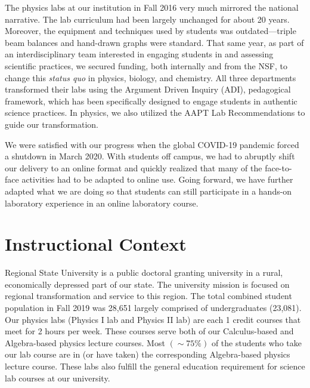 \documentclass[aip, numerical, preprint]{revtex4-2}
\begin{document}

The physics labs at our institution in Fall 2016 very much mirrored the national narrative.
The lab curriculum had been largely unchanged for about 20 years. Moreover, the equipment and techniques used by students was outdated---triple beam balances and hand-drawn graphs were
standard.  That same year, as part of an interdisciplinary team interested in engaging
students in and assessing scientific practices, we secured
funding, both internally and from the NSF, to change this \emph{status quo} in physics, biology, and
chemistry.  All three departments transformed their labs using the Argument Driven Inquiry (ADI),\citep{Sampson2011,Walker2011,Walker2016} pedagogical framework, which has
been specifically designed to engage students in authentic science practices. In physics, we
also utilized the AAPT Lab Recommendations to guide our transformation.\citep{kozminski2014aapt}

We were satisfied with our progress when the global COVID-19 pandemic forced a shutdown in March 2020.  With students off campus, we had to abruptly
shift our delivery to an online format and quickly realized that many of the face-to-face activities  had to be adapted to online use.  Going forward, we have
further adapted what we are doing so that students can still participate in a hands-on
laboratory experience in an online laboratory course.


\section{Instructional Context}

Regional State University is a public doctoral granting university in a rural, economically
depressed part of our state.  The university mission is focused on regional transformation and
service to this region.  The total combined student population in Fall 2019 was 28,651 largely
comprised of undergraduates (23,081). Our physics labs (Physics \textrm{I} lab and Physics
\textrm{II} lab) are each 1 credit courses that meet for 2 hours per week. These courses serve
both of our Calculus-based and Algebra-based physics lecture courses.  Most $(\sim 75\%)$ of
the students who take our lab course are in (or have taken) the corresponding Algebra-based
physics lecture course. These labs also fulfill the general education requirement for science
lab courses at our university.
\end{document}

